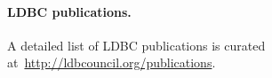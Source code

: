 

\paragraph*{LDBC publications.}

A detailed list of LDBC publications is curated at~\url{http://ldbcouncil.org/publications}.